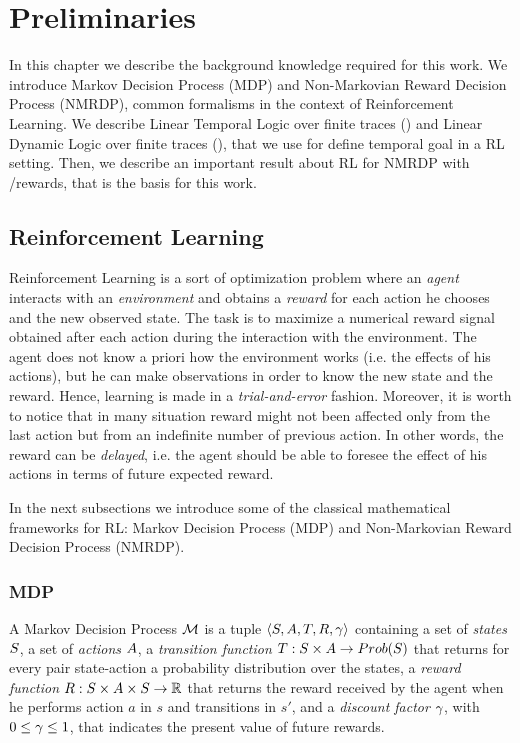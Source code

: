 \chapter{Preliminaries}
\label{preliminaries}
In this chapter we describe the background knowledge required for this work. We introduce Markov Decision Process (MDP) and Non-Markovian Reward Decision Process (NMRDP), common formalisms in the context of Reinforcement Learning. We describe Linear Temporal Logic over finite traces (\LTLf) and Linear Dynamic Logic over finite traces (\LDLf), that we use for define temporal goal in a RL setting. Then, we describe an important result about RL for NMRDP with \LTLf/\LDLf rewards, that is the basis for this work.

\section{Reinforcement Learning}
\label{RL}
Reinforcement Learning \citep{Sutton:1998:IRL:551283} is a sort of optimization problem where an \emph{agent} interacts with an \emph{environment} and obtains a \emph{reward} for each action he chooses and the new observed state. The task is to maximize a numerical reward signal obtained after each action during the interaction with the environment. The agent does not know a priori how the environment works (i.e. the effects of his actions), but he can make observations in order to know the new state and the reward. Hence, learning is made in a \emph{trial-and-error} fashion. Moreover, it is worth to notice that in many situation reward might not been affected only from the last action but from an indefinite number of previous action. In other words, the reward can be \emph{delayed}, i.e. the agent should be able to foresee the effect of his actions in terms of future expected reward. 

In the next subsections we introduce some of the classical mathematical frameworks for RL: Markov Decision Process (MDP) and Non-Markovian Reward Decision Process (NMRDP).
\subsection{MDP}
\label{MDP}

	A Markov Decision Process $\mathcal{M}$ is a tuple $\langle S, A, T, R, \gamma \rangle$ containing a set of \emph{states} $S$, a set of \emph{actions} $A$, a \emph{transition function} $T: S \times A \to Prob(S)$ that returns for every pair state-action a probability distribution over the states, a \emph{reward function} $R: S \times A \times S \to \mathbb{R}$ that returns the reward received by the agent when he performs action $a$ in $s$ and transitions in $s'$, and a \emph{discount factor} $\gamma$, with $0 \le \gamma \le 1$, that indicates the present value of future rewards.
	
